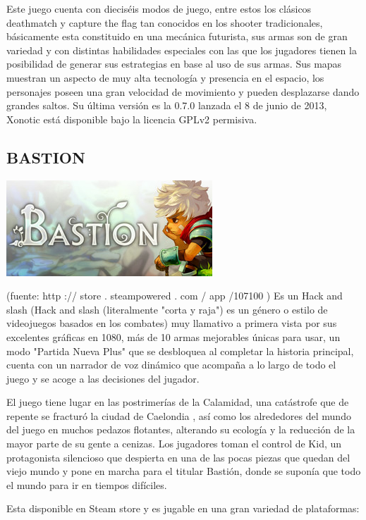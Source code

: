 Este juego cuenta con dieciséis modos de juego, entre estos los
clásicos deathmatch y capture the flag tan conocidos en los
shooter tradicionales, básicamente esta constituido en una
mecánica futurista, sus armas son de gran variedad y con
distintas habilidades especiales con las que los jugadores tienen
la posibilidad de generar sus
estrategias en base al uso de sus armas. Sus mapas muestran un
aspecto de muy alta tecnología y presencia en el espacio, los
personajes poseen una gran velocidad de movimiento y pueden
desplazarse dando grandes saltos.
Su última versión es la 0.7.0 lanzada el 8 de junio de 2013,
Xonotic está disponible bajo la licencia GPLv2 permisiva.

\subsection*{BASTION}
\includegraphics[scale=0.5]{img/cp07/img0702.png}

(fuente: http :// store . steampowered . com / app /107100 )
Es un Hack and slash (Hack and slash (literalmente "corta y
raja") es un género o estilo de videojuegos basados en los
combates) muy llamativo a primera vista por sus excelentes
gráficas en 1080, más de 10 armas mejorables únicas para usar,
un modo "Partida Nueva Plus" que se desbloquea al completar la
historia principal, cuenta con un narrador de voz dinámico que
acompaña a lo largo de todo el juego y se acoge a las decisiones
del jugador.

El juego tiene lugar en las postrimerías de la Calamidad, una
catástrofe que de repente se fracturó la ciudad de Caelondia ,
así como los alrededores del mundo del juego en muchos
pedazos flotantes, alterando su ecología y la reducción de la
mayor parte de su gente a cenizas. Los jugadores toman el
control de Kid, un protagonista silencioso que despierta en una
de las pocas piezas que quedan del viejo mundo y pone en
marcha para el titular Bastión, donde se suponía que todo el
mundo para ir en tiempos difíciles.

Esta disponible en Steam store y es jugable en una gran
variedad de plataformas:

